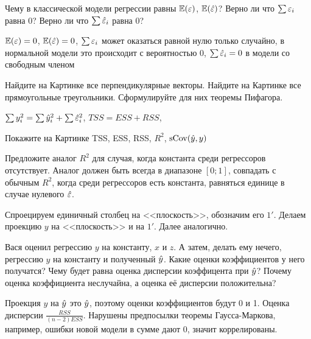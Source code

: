 \documentclass[pdftex,11pt,openany]{book}\usepackage[]{graphicx}\usepackage[]{color}
\begin{document}
\begin{problem}
Чему в классической модели регрессии равны $\mathbb{E}(\varepsilon)$, $\mathbb{E}(\hat{\varepsilon})$? Верно ли что $\sum \varepsilon_i$ равна 0? Верно ли что $\sum \hat{\varepsilon}_i$ равна 0?
\end{problem}
\begin{solution}
$\mathbb{E}(\varepsilon)=0$, $\mathbb{E}(\hat{\varepsilon})=0$, $\sum \varepsilon_i$ может оказаться равной нулю только случайно, в нормальной модели это происходит с вероятностью 0, $\sum \hat{\varepsilon}_i=0$ в модели со свободным членом
\end{solution}


\begin{problem}
Найдите на Картинке все перпендикулярные векторы. Найдите на Картинке все прямоугольные треугольники. Сформулируйте для них теоремы Пифагора.
\end{problem}

\begin{solution}
$\sum y_i^2=\sum \hat{y}_i^2+\sum \hat{\varepsilon}_i^2$, $TSS=ESS+RSS$, 
\end{solution}


\begin{problem}
Покажите на Картинке TSS, ESS, RSS, $R^2$, $\operatorname{sCov}(\hat{y},y)$
\end{problem}
\begin{solution}
\end{solution}

\begin{problem}
Предложите аналог $R^2$ для случая, когда константа среди регрессоров отсутствует. Аналог должен быть всегда в диапазоне $[0;1]$, совпадать с обычным $R^2$, когда среди регрессоров есть константа, равняться единице в случае нулевого $\hat{\varepsilon}$.
\end{problem}

\begin{solution}
Спроецируем единичный столбец на <<плоскость>>, обозначим его $1'$. Делаем проекцию $y$ на <<плоскость>> и на $1'$. Далее аналогично. 
\end{solution}


\begin{problem}
Вася оценил регрессию $y$ на константу, $x$ и $z$. А затем, делать ему нечего, регрессию $y$ на константу и полученный $\hat{y}$. Какие оценки коэффициентов у него получатся? Чему будет равна оценка дисперсии коэффицента при $\hat{y}$? Почему оценка коэффициента неслучайна, а оценка её дисперсии положительна?
\end{problem}

\begin{solution}
Проекция $y$ на $\hat{y}$ это $\hat{y}$, поэтому оценки коэффициентов будут 0 и 1. Оценка дисперсии $\frac{RSS}{(n-2)ESS}$. Нарушены предпосылки теоремы Гаусса-Маркова, например, ошибки новой модели в сумме дают 0, значит коррелированы. 
\end{solution}
\end{document}
